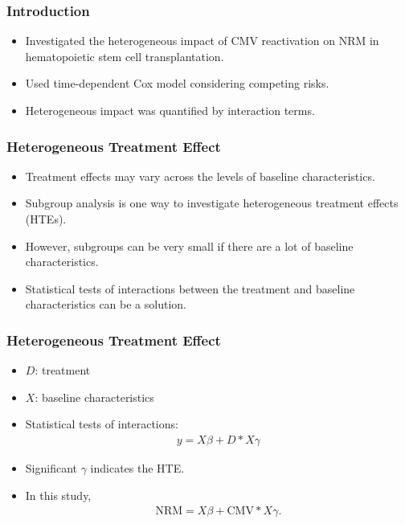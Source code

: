 \documentclass[aspectratio=169, 12pt]{beamer}
\begin{document}
	\begin{frame}
	\frametitle{Introduction}
	\begin{itemize}
	\item Investigated the heterogeneous impact of CMV reactivation on NRM in hematopoietic stem cell transplantation.
	\item Used time-dependent Cox model considering competing risks.
	\item Heterogeneous impact was quantified by interaction terms.

	\end{itemize}
	\end{frame}

	\begin{frame}
	\frametitle{Heterogeneous Treatment Effect}
	\begin{itemize}
	\item Treatment effects may vary across the levels of baseline characteristics.
	\item Subgroup analysis is one way to investigate heterogeneous treatment effects (HTEs).
	\item However, subgroups can be very small if there are a lot of baseline characteristics.
	\item Statistical tests of interactions between the treatment and baseline characteristics can be a solution.

	\end{itemize}
	\end{frame}

	\begin{frame}
	\frametitle{Heterogeneous Treatment Effect}
	\begin{itemize}
	\item $D$: treatment
	\item $X$: baseline characteristics
	\item Statistical tests of interactions:
	\begin{eqnarray*}
	y = X \beta + D * X \gamma
	\end{eqnarray*}
	\item Significant $\gamma$ indicates the HTE.
	\item In this study,
	\begin{eqnarray*}
	\text{NRM} = X \beta + \text{CMV} * X \gamma.
	\end{eqnarray*}

	\end{itemize}
	\end{frame}
\end{document}
